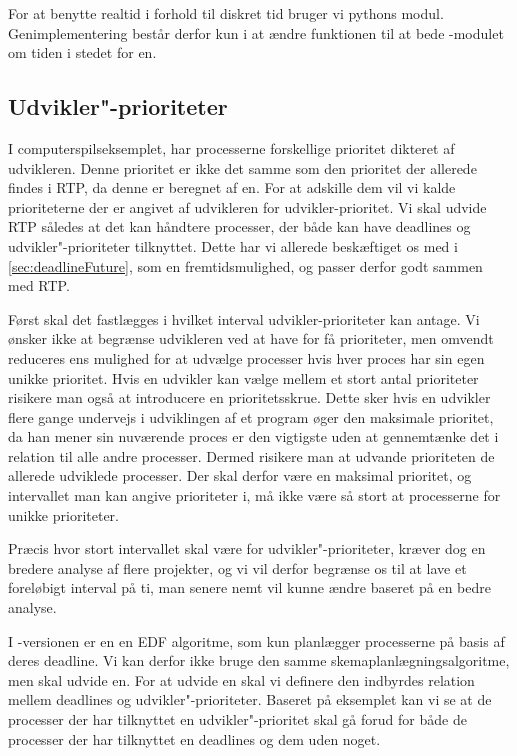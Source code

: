For at benytte realtid i forhold til diskret tid bruger vi pythons  modul. Genimplementering består derfor kun i at ændre funktionen  til at bede -modulet om tiden i stedet for \sched en.

\subsection{Udvikler"-prioriteter}
I computerspilseksemplet, har processerne forskellige prioritet dikteret af udvikleren. Denne prioritet er ikke det samme som den prioritet der allerede findes i RTP, da denne  er beregnet af \sched en. For at adskille dem vil vi kalde prioriteterne der er angivet af udvikleren for udvikler-prioritet. Vi skal udvide RTP således at det kan håndtere processer, der både kan have deadlines og udvikler"-prioriteter tilknyttet. Dette har vi allerede beskæftiget os med i \cref{sec:deadlineFuture}, som en fremtidsmulighed, og passer derfor godt sammen med RTP.

Først skal det fastlægges i hvilket interval udvikler-prioriteter kan antage. Vi ønsker ikke at begrænse udvikleren ved at have for få prioriteter, men omvendt reduceres \sched ens  mulighed for at udvælge processer hvis hver proces har sin egen unikke prioritet. Hvis en udvikler kan vælge mellem et stort antal prioriteter risikere man også at introducere en prioritetsskrue. Dette sker hvis en udvikler flere gange undervejs i udviklingen af et program øger den maksimale prioritet, da han mener sin nuværende proces er den vigtigste uden at gennemtænke det i relation til alle andre processer. Dermed risikere man at udvande prioriteten de allerede udviklede processer.  Der skal derfor være en maksimal prioritet, og intervallet man kan angive prioriteter i, må ikke være så stort at processerne for unikke prioriteter.

Præcis  hvor stort intervallet skal være for udvikler"-prioriteter, kræver dog en bredere analyse af flere projekter, og vi vil derfor begrænse os til at lave et foreløbigt interval på ti, man senere nemt vil kunne ændre baseret på en bedre analyse.


I -versionen er \sched en en EDF algoritme, som kun planlægger processerne på basis af deres deadline. Vi kan derfor ikke bruge den samme skemaplanlægningsalgoritme, men skal udvide \sched en. For at udvide \sched en skal vi definere den indbyrdes relation mellem deadlines og udvikler"-prioriteter. Baseret på eksemplet kan vi se at de processer der har  tilknyttet en udvikler"-prioritet skal gå forud for både de processer der har tilknyttet en deadlines og dem uden noget. 

